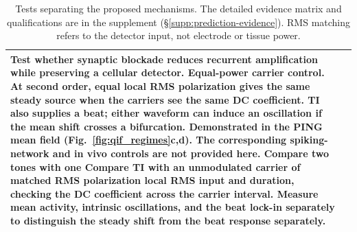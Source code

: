 \documentclass[11pt,a4paper]{article}
\providecommand{\DIFaddtex}[1]{{\protect\color{blue} \sf #1}} %
\providecommand{\DIFdeltex}[1]{{\protect\color{red} \scriptsize #1}} %
\providecommand{\DIFaddend}{} %
\providecommand{\DIFaddFL}[1]{\DIFadd{#1}} %
\providecommand{\DIFdelFL}[1]{\DIFdel{#1}} %
\providecommand{\DIFaddbeginFL}{} %
\providecommand{\DIFaddendFL}{} %
\providecommand{\DIFdelbeginFL}{} %
\providecommand{\DIFdelendFL}{} %
\providecommand{\DIFadd}[1]{\texorpdfstring{\DIFaddtex{#1}}{#1}} %
\providecommand{\DIFdel}[1]{\texorpdfstring{\DIFdeltex{#1}}{}} %
\begin{document}
\begin{table}[htbp]
\begin{tabular}{@{}>{\raggedright\arraybackslash}p{}
 >{\raggedright\arraybackslash}p{}@{}}
{}%
\DIFdelFL{Test whether synaptic blockade reduces recurrent amplification while preserving
a cellular detector. }%
\DIFdelFL{\textbf{Equal-power carrier control.} At second order, equal local RMS
polarization gives the same steady source when the carriers see the same DC
coefficient. TI also supplies a beat; either waveform can induce an oscillation
if the mean shift crosses a bifurcation.
}%
\DIFdelFL{Demonstrated in the PING mean field (Fig.~\ref{fig:qif_regimes}c,d).
The corresponding spiking-network and in vivo controls are not provided here.
}%
\DIFdelFL{Compare two tones with one }\DIFdelendFL \DIFaddbeginFL \DIFaddFL{Compare TI with an unmodulated }\DIFaddendFL carrier
of matched \DIFdelbeginFL \DIFdelFL{RMS polarization }\DIFdelendFL \DIFaddbeginFL \DIFaddFL{local RMS input }\DIFaddendFL and duration, checking the DC coefficient across
the carrier interval. Measure mean activity, intrinsic oscillations, and \DIFaddbeginFL \DIFaddFL{the
}\DIFaddendFL beat \DIFdelbeginFL \DIFdelFL{lock-in separately to distinguish the
steady
shift from the beat response}\DIFdelendFL \DIFaddbeginFL \DIFaddFL{separately}\DIFaddendFL . \\
\DIFdelbeginFL %
\DIFdelendFL \DIFaddbeginFL \bottomrule
\end{tabular}
\caption{\DIFaddFL{Tests separating the proposed mechanisms. The detailed evidence matrix
and qualifications are in the supplement (\S\ref{supp:prediction-evidence}).
RMS matching refers to the detector input, not electrode or tissue power.}}
\label{tab:predictions}
\end{table}
\DIFaddend
\end{document}

